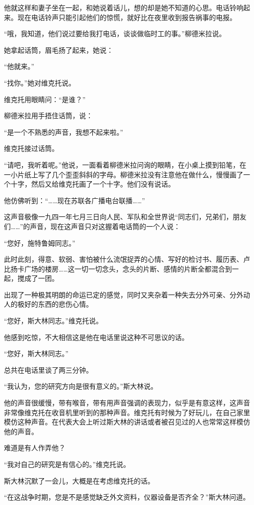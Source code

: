 他就这样和妻子坐在一起，和她说着话儿，想的却是她不知道的心思。电话铃响起来。现在电话铃声只能引起他们的惊慌，就好比在夜里收到报告祸事的电报。

“哦，我知道，他们说过要给我打电话，谈谈做临时工的事。”柳德米拉说。

她拿起话筒，眉毛扬了起来，她说：

“他就来。”

“找你。”她对维克托说。

维克托用眼睛问：“是谁？”

柳德米拉用手捂住话筒，说：

“是一个不熟悉的声音，我想不起来啦。”

维克托接过话筒。

“请吧，我听着呢。”他说，一面看着柳德米拉问询的眼睛，在小桌上摸到铅笔，在一小片纸上写了几个歪歪斜斜的字母。柳德米拉没有注意他在做什么，慢慢画了一个十字，然后又给维克托画了一个十字。他们没有说话。

他仿佛听到：“……现在苏联各广播电台联播……”

这声音极像一九四一年七月三日向人民、军队和全世界说“同志们，兄弟们，朋友们……”的声音，现在这声音只对这握着电话筒的一个人说：

“您好，施特鲁姆同志。”

此时此刻，得意、软弱、害怕被什么流氓捉弄的心情、写好的检讨书、履历表、卢比扬卡广场的楼房……这一切一切念头，念头的片断、感情的片断全都混合到一起，搅成了一团。

出现了一种极其明朗的命运已定的感觉，同时又夹杂着一种失去分外可亲、分外动人的极好的东西的悲伤心情。

“您好，斯大林同志。”维克托说。

他感到吃惊，不大相信这是他在电话里说这种不可思议的话。

“您好，斯大林同志。”

总共在电话里谈了两三分钟。

“我认为，您的研究方向是很有意义的。”斯大林说。

他的声音很缓慢，带有喉音，带有用声音强调的表现力，似乎是有意这样，这声音非常像维克托在收音机里听到的那种声音。维克托有时候为了好玩儿，在自己家里模仿这种声音。在代表大会上听过斯大林的讲话或者被召见过的人也常常这样模仿他的声音。

难道是有人作弄他？

“我对自己的研究是有信心的。”维克托说。

斯大林沉默了一会儿，大概是在考虑维克托的话。

“在这战争时期，您是不是感觉缺乏外文资料，仪器设备是否齐全？”斯大林问道。

